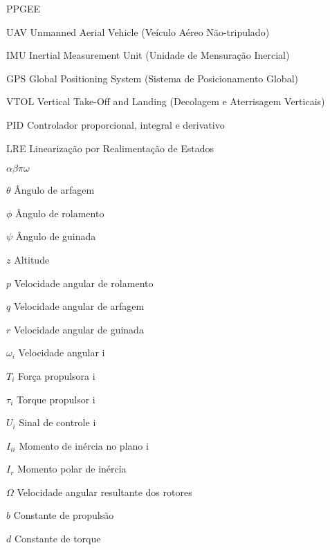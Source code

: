 \documentclass[repeatfields,xlists,xpacks,oneside,yearsonly]{ufrgscca}
\begin{document}

\setcounter{tocdepth}{3}

\listoffigures

\listoftables

\listofcodelist %

\begin{listofabbrv}{PPGEE}
    \item[UAV] Unmanned Aerial Vehicle (Veículo Aéreo Não-tripulado)
    \item[IMU] Inertial Measurement Unit (Unidade de Mensuração Inercial)
    \item[GPS] Global Positioning System (Sistema de Posicionamento Global)
    \item[VTOL] Vertical Take-Off and Landing (Decolagem e Aterrisagem Verticais)
    \item[PID] Controlador proporcional, integral e derivativo
    \item[LRE] Linearização por Realimentação de Estados
\end{listofabbrv}

\begin{listofsymbols}{$\alpha\beta\pi\omega$}
       \item[$\theta$] Ângulo de arfagem
       \item[$\phi$] Ângulo de rolamento
       \item[$\psi$] Ângulo de guinada
       \item[$z$] Altitude
       \item[$p$] Velocidade angular de rolamento
       \item[$q$] Velocidade angular de arfagem
       \item[$r$] Velocidade angular de guinada
       \item[$\omega_i$] Velocidade angular i
       \item[$T_i$] Força propulsora i
       \item[$\tau_i$] Torque propulsor i
       \item[$U_i$] Sinal de controle i
       \item[$I_{ii}$] Momento de inércia no plano i
       \item[$I_{r}$] Momento polar de inércia
       \item[$\Omega$] Velocidade angular resultante dos rotores
       \item[$b$] Constante de propulsão
       \item[$d$] Constante de torque
\end{listofsymbols}


\tableofcontents







\printbibliography
\end{document}
